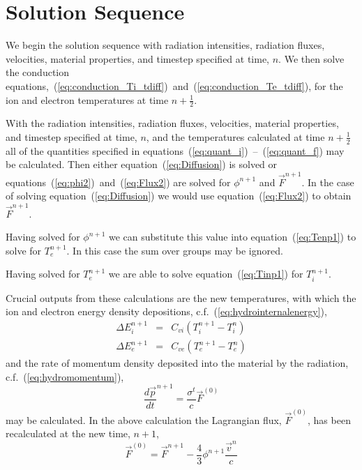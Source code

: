 \documentclass[12pt]{article}
\begin{document}
\section{Solution Sequence}

We begin the solution sequence with radiation intensities,
radiation fluxes, velocities,
material properties, and timestep specified at time, $n$.
We then solve the conduction
equations,~(\ref{eq:conduction_Ti_tdiff})~and~(\ref{eq:conduction_Te_tdiff}),
for the ion and electron temperatures at time $n+\frac{1}{2}$.

With the radiation intensities,
radiation fluxes, velocities,
material properties, and timestep specified at time, $n$,
and the temperatures calculated at time $n+\frac{1}{2}$
all of the quantities specified in
equations~(\ref{eq:quant_i})~--~(\ref{eq:quant_f}) may be calculated.
Then either equation~(\ref{eq:Diffusion}) is
solved or equations~(\ref{eq:phi2})~and~(\ref{eq:Flux2}) are solved for
$\phi^{n+1}$ and $\vec{F}^{n+1}$.
In the case of solving equation~(\ref{eq:Diffusion}) we would use
equation~(\ref{eq:Flux2}) to obtain $\vec{F}^{n+1}$.

Having solved for $\phi^{n+1}$ we can substitute this
value into equation~(\ref{eq:Tenp1}) to solve for $T_{e}^{n+1}$.
In this case the sum over groups may be ignored.

Having solved
for $T_{e}^{n+1}$ we are able to
solve equation~(\ref{eq:Tinp1}) for $T_{i}^{n+1}$.

Crucial outputs from these calculations are
the new temperatures, with which the ion and electron
energy density depositions,
c.f.~(\ref{eq:hydrointernalenergy}),
\begin{eqnarray}
        \Delta E_{i}^{n+1} &=& C_{vi} ( T_{i}^{n+1} - T_{i}^{n})
  \\
        \Delta E_{e}^{n+1} &=& C_{ve} ( T_{e}^{n+1} - T_{e}^{n})
\end{eqnarray}
and the rate of momentum density
deposited into the material by the radiation,
c.f.~(\ref{eq:hydromomentum}),
\begin{equation}
   {\frac{d\vec{p}}{dt}}^{n+1} = \frac{\sigma^{t}}{c} \vec{F}^{(0)}
\end{equation}
may be calculated.
In the above calculation
the Lagrangian flux, $\vec{F}^{(0)}$, has been recalculated at the
new time, $n+1$,
\begin{equation}
   \vec{F}^{(0)} = \vec{F}^{n+1} - \frac{4}{3} \phi^{n+1}
                                                \frac{\vec{v}^{n}}{c}
\end{equation}
\end{document}
